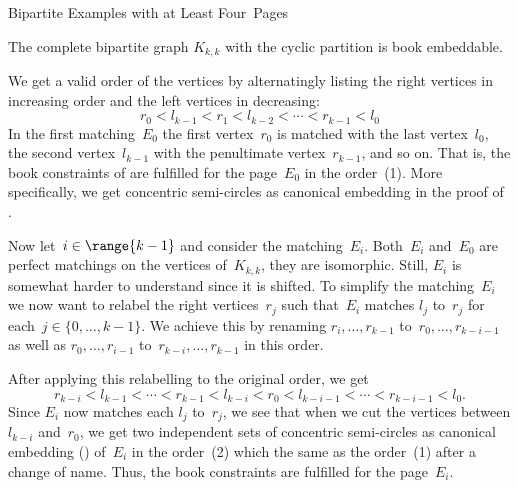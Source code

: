 \begin{subsection}{Bipartite Examples with at Least Four~Pages}
\begin{lemma}
The complete bipartite graph $K_{k,k}$ with the cyclic partition is
book embeddable.
\end{lemma}
\begin{myproof}
We get a valid order of the vertices by alternatingly listing the right vertices
in increasing order and the left vertices in decreasing:
\[
r_0 < l_{k-1} < r_1 < l_{k-2} < \dotsb < r_{k-1} < l_0\tag{1}
\]
In the first matching~$E_0$
the first vertex~$r_0$ is matched with the last vertex~$l_0$, the
second vertex~$l_{k-1}$ with the penultimate vertex~$r_{k-1}$, and so on.
That is, the book constraints of  are fulfilled for the page~$E_0$ in the order~(1). More specifically,
we get concentric semi-circles as canonical embedding in the proof of .

Now let~$i \in \range{k-1}$ and consider the matching~$E_i$. Both~$E_i$ and~$E_0$ are perfect matchings on the vertices of~$K_{k, k}$, \ie they are isomorphic.
Still, $E_i$ is somewhat harder to understand since it is shifted. To simplify the matching~$E_i$
we now want to relabel the right vertices~$r_j$ such that~$E_i$ matches $l_j$ to~$r_j$
for each~$j\in\{0, \dotsc, k-1\}$.  We achieve this by renaming $r_i, \dotsc, r_{k-1}$
to~$r_0, \dotsc, r_{k-i-1}$ as well as $r_0, \dotsc, r_{i-1}$ to~$r_{k-i}, \dotsc, r_{k-1}$ in this order.

After applying this relabelling to the original order, we get
\[
r_{k-i} < l_{k-1} < \dotsb < r_{k-1} < l_{k-i} < r_0 < l_{k-i-1} < \dotsb < r_{k-i-1} < l_0.\tag{2}
\]
Since $E_i$ now matches each $l_j$ to~$r_j$, we see that 
when we cut the vertices between $l_{k-i}$ and~$r_0$,
we get two independent sets of concentric semi-circles as canonical embedding () of~$E_i$ in the order~(2) which the same as the order~(1) after a change of name. Thus, the book constraints are fulfilled for the page~$E_i$.\qedhere


\end{myproof}
\end{subsection}
